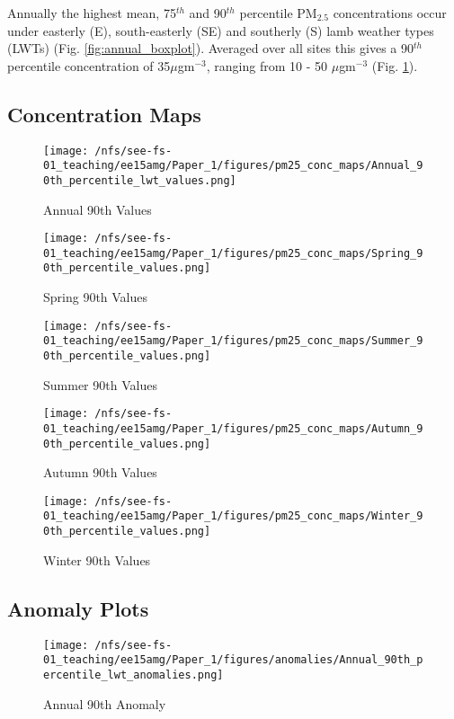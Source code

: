\documentclass[10pt]{article}
\begin{document}
Annually the highest mean, 75$^{th}$ and 90$^{th}$ percentile PM$_{2.5}$ concentrations occur under easterly (E), south-easterly (SE) and southerly (S) lamb weather types (LWTs) (Fig. \ref{fig:annual_boxplot}). Averaged over all sites this gives a 90$^{th}$ percentile concentration of 35$\mu$gm$^{-3}$, ranging from 10 - 50 $\mu$gm$^{-3}$ (Fig. \ref{fig:annual_90th_values}).

\subsection*{Concentration Maps}

\begin{figure}
	\texttt{[image: /nfs/see-fs-01\_teaching/ee15amg/Paper\_1/figures/pm25\_conc\_maps/Annual\_90th\_percentile\_lwt\_values.png]}
	\caption{Annual 90th Values}
	\label{fig:annual_90th_values}
\end{figure}

\begin{figure}
	\texttt{[image: /nfs/see-fs-01\_teaching/ee15amg/Paper\_1/figures/pm25\_conc\_maps/Spring\_90th\_percentile\_values.png]}
	\caption{Spring 90th Values}
\end{figure}

\begin{figure}
	\texttt{[image: /nfs/see-fs-01\_teaching/ee15amg/Paper\_1/figures/pm25\_conc\_maps/Summer\_90th\_percentile\_values.png]}
	\caption{Summer 90th Values}
\end{figure}

\begin{figure}
	\texttt{[image: /nfs/see-fs-01\_teaching/ee15amg/Paper\_1/figures/pm25\_conc\_maps/Autumn\_90th\_percentile\_values.png]}
	\caption{Autumn 90th Values}
\end{figure}

\begin{figure}
	\texttt{[image: /nfs/see-fs-01\_teaching/ee15amg/Paper\_1/figures/pm25\_conc\_maps/Winter\_90th\_percentile\_values.png]}
	\caption{Winter 90th Values}
\end{figure}




\subsection*{Anomaly Plots}


\begin{figure}
	\texttt{[image: /nfs/see-fs-01\_teaching/ee15amg/Paper\_1/figures/anomalies/Annual\_90th\_percentile\_lwt\_anomalies.png]}
	\caption{Annual 90th Anomaly}
\end{figure}
\end{document}
